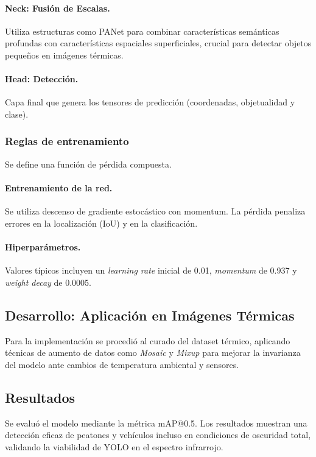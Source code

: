 \documentclass{article}
\begin{document}
\paragraph{Neck: Fusión de Escalas.}
Utiliza estructuras como PANet para combinar características semánticas profundas con características espaciales superficiales, crucial para detectar objetos pequeños en imágenes térmicas.

\paragraph{Head: Detección.}
Capa final que genera los tensores de predicción (coordenadas, objetualidad y clase).

\subsubsection{Reglas de entrenamiento}
Se define una función de pérdida compuesta.

\paragraph{Entrenamiento de la red.}
Se utiliza descenso de gradiente estocástico con momentum. La pérdida penaliza errores en la localización (IoU) y en la clasificación.

\paragraph{Hiperparámetros.}
Valores típicos incluyen un \textit{learning rate} inicial de 0.01, \textit{momentum} de 0.937 y \textit{weight decay} de 0.0005.

\subsection{Desarrollo: Aplicación en Imágenes Térmicas}
Para la implementación se procedió al curado del dataset térmico, aplicando técnicas de aumento de datos como \textit{Mosaic} y \textit{Mixup} para mejorar la invarianza del modelo ante cambios de temperatura ambiental y sensores.

\subsection{Resultados}
Se evaluó el modelo mediante la métrica mAP@0.5. Los resultados muestran una detección eficaz de peatones y vehículos incluso en condiciones de oscuridad total, validando la viabilidad de YOLO en el espectro infrarrojo.
\end{document}

